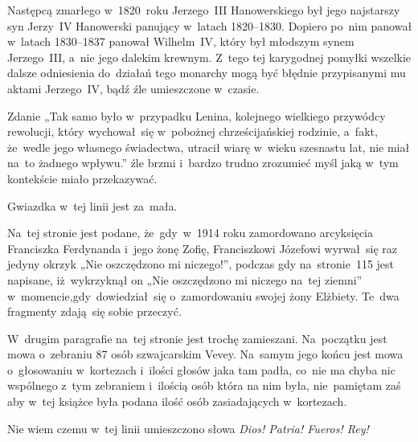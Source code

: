 \documentclass[a4paper,11pt]{article}
\begin{document}
\noindent
{} Następcą zmarłego w~1820~roku Jerzego~III Hanowerskiego był jego
najstarszy syn Jerzy~IV Hanowerski panujący w~latach 1820--1830. Dopiero
po~nim panował w~latach 1830--1837 panował Wilhelm~IV, który był młodszym
synem Jerzego~III, a~nie jego dalekim krewnym. Z~tego tej karygodnej
pomyłki wszelkie dalsze odniesienia do~działań tego monarchy mogą być
błędnie przypisanymi mu aktami Jerzego~IV, bądź źle umieszczone w~czasie.

\VerSpaceFour





\noindent
{} Zdanie „Tak samo było w~przypadku Lenina, kolejnego
wielkiego przywódcy rewolucji, który wychował~się w~pobożnej
chrześcijańskiej rodzinie, a~fakt, że~wedle jego własnego świadectwa,
utracił wiarę w~wieku szesnastu lat, nie miał na~to żadnego wpływu.”
źle brzmi i~bardzo trudno zrozumieć myśl jaką w~tym kontekście miało
przekazywać.

\VerSpaceFour





\noindent
{} Gwiazdka w~tej linii jest za~mała.

\VerSpaceFour





\noindent
{} Na~tej stronie jest podane, że~gdy~w~1914 roku zamordowano
arcyksięcia Franciszka Ferdynanda i~jego żonę Zofię, Franciszkowi Józefowi
wyrwał~się raz jedyny okrzyk „Nie oszczędzono mi niczego!”, podczas gdy
na~stronie~115 jest napisane, iż~wykrzyknął on „Nie oszczędzono mi niczego
na~tej ziemni” w~momencie,gdy~dowiedział~się o~zamordowaniu swojej żony
Elżbiety. Te~dwa fragmenty zdają~się sobie przeczyć.

\VerSpaceFour





\noindent
{} W~drugim paragrafie na~tej stronie jest trochę zamieszani.
Na~początku jest mowa o~zebraniu 87 osób szwajcarskim Vevey. Na~samym jego
końcu jest mowa o~głosowaniu w~kortezach i~ilości głosów jaka tam padła,
co~nie ma chyba nic wspólnego z~tym zebraniem i~ilością osób która na nim
była, nie~pamiętam zaś aby w~tej książce była podana ilość osób
zasiadających w~kortezach.

\VerSpaceFour





\noindent
{} Nie wiem czemu w~tej linii umieszczono słowa
\textit{Dios! Patria! Fueros! Rey!}
\end{document}
